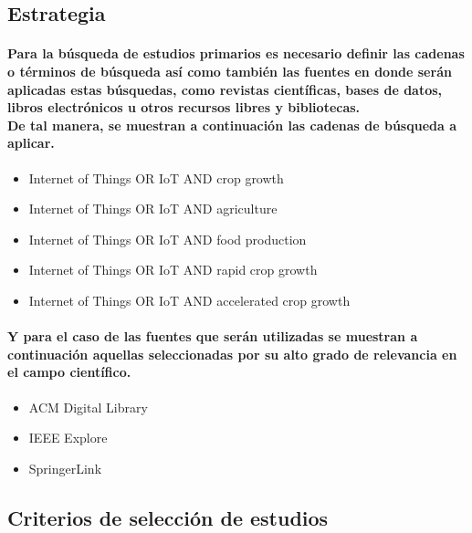 \documentclass[10pt, twocolumn]{article}
\begin{document}
\subsection{Estrategia}
\paragraph{Para la búsqueda de estudios primarios es necesario definir las cadenas o términos de búsqueda así como también las fuentes en donde serán aplicadas estas búsquedas, como revistas científicas, bases de datos, libros electrónicos u otros recursos libres y bibliotecas. \\ De tal manera, se muestran a continuación las cadenas de búsqueda a aplicar.}
\begin{itemize}
	\item{Internet of Things OR IoT AND crop growth}
	\item{Internet of Things OR IoT AND agriculture}
	\item{Internet of Things OR IoT AND food production}
	\item{Internet of Things OR IoT AND rapid crop growth}
	\item{Internet of Things OR IoT AND accelerated crop growth}
\end{itemize}
\paragraph{Y para el caso de las fuentes que serán utilizadas se muestran a continuación aquellas seleccionadas por su alto grado de relevancia en el campo científico.}
\begin{itemize}
	\item{ACM Digital Library}
	\item{IEEE Explore}
	\item{SpringerLink}
\end{itemize}

\subsection{Criterios de selección de estudios}
\end{document}
